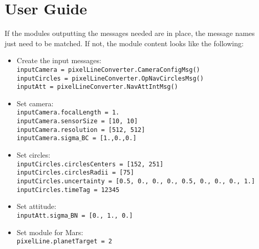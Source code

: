 
\section{User Guide}
If the modules outputting the messages needed are in place, the message names just need to be matched. If not, the module content looks like the following:

\begin{itemize}
\item Create the input messages: \\
\texttt{inputCamera = pixelLineConverter.CameraConfigMsg()} \\
\texttt{inputCircles = pixelLineConverter.OpNavCirclesMsg()}\\
\texttt{inputAtt = pixelLineConverter.NavAttIntMsg()}\\
\item Set camera: \\
\texttt{inputCamera.focalLength = 1.}\\
\texttt{inputCamera.sensorSize = [10, 10]}\\
\texttt{inputCamera.resolution = [512, 512]}\\
\texttt{inputCamera.sigma$\_$BC = [1.,0.,0.]}\\
\item Set circles: \\
\texttt{inputCircles.circlesCenters = [152, 251]}\\
\texttt{inputCircles.circlesRadii = [75]}\\
\texttt{inputCircles.uncertainty = [0.5, 0., 0., 0., 0.5, 0., 0., 0., 1.]}\\
\texttt{inputCircles.timeTag = 12345}\\
\item Set attitude: \\
\texttt{inputAtt.sigma$\_$BN = [0., 1., 0.]}\\
\item Set module for Mars: \\
\texttt{pixelLine.planetTarget = 2}\\
  \end{itemize}